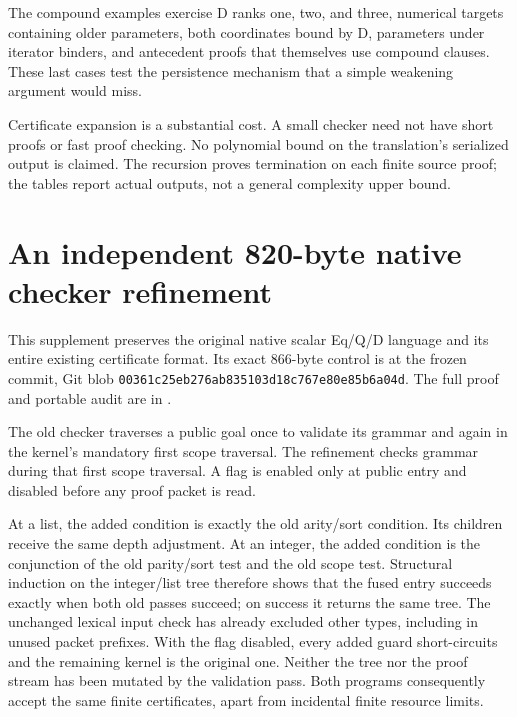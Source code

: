 \documentclass[11pt,letterpaper]{article}
\theoremstyle{definition}
\begin{document}
The compound examples exercise D ranks one, two, and three, numerical
targets containing older parameters, both coordinates bound by D,
parameters under iterator binders, and antecedent proofs that themselves
use compound clauses. These last cases test the persistence mechanism
that a simple weakening argument would miss.


Certificate expansion is a substantial cost. A small checker need not
have short proofs or fast proof checking. No polynomial bound on the
translation's serialized output is claimed. The recursion proves
termination on each finite source proof; the tables report actual
outputs, not a general complexity upper bound.

\section{An independent 820-byte native checker refinement}
\label{sec:fusion}

This supplement preserves the original native scalar Eq/Q/D language
and its entire existing certificate format. Its exact 866-byte control
is  at the frozen
commit, Git blob \texttt{00361c25eb276ab835103d18c767e80e85b6a04d}.
The full proof and portable audit are in .

The old checker traverses a public goal once to validate its grammar and
again in the kernel's mandatory first scope traversal. The refinement
checks grammar during that first scope traversal. A flag is enabled only
at public entry and disabled before any proof packet is read.

At a list, the added condition is exactly the old arity/sort condition.
Its children receive the same depth adjustment. At an integer, the
added condition is the conjunction of the old parity/sort test and the
old scope test. Structural induction on the integer/list tree therefore
shows that the fused entry succeeds exactly when both old passes succeed;
on success it returns the same tree. The unchanged lexical input check
has already excluded other types, including in unused packet prefixes.
With the flag disabled, every added guard short-circuits and the remaining
kernel is the original one. Neither the tree nor the proof stream has
been mutated by the validation pass. Both programs consequently accept
the same finite certificates, apart from incidental finite resource
limits.
\end{document}
